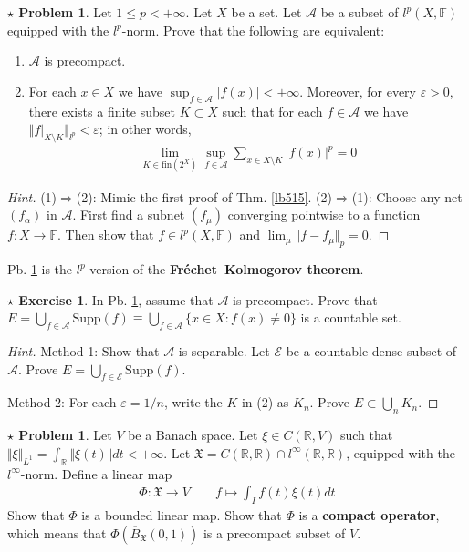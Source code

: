 \documentclass[12pt,b5paper,notitlepage]{article}
\theoremstyle{definition}
\newtheorem{sexe}[df]{$\star$ Exercise}
\newtheorem{sprob}[prob]{\color{red}$\star$ Problem}
\theoremstyle{plain}
\newcommand{\fk}{\mathfrak}
\newcommand{\mc}{\mathcal}
\newcommand{\ovl}{\overline}
\newcommand{\scr}{\mathscr}
\newcommand{\Rbb}{\mathbb R}
\newcommand{\fin}{\mathrm{fin}}
\newcommand{\Supp}{\mathrm{Supp}}
\newcommand{\Fbb}{\mathbb F}
\newcommand{\eps}{\varepsilon}
\numberwithin{equation}{section}
\begin{document}
\begin{sprob}\label{lb570}
Let $1\leq p<+\infty$. Let $X$ be a set. Let $\scr A$ be a subset of $l^p(X,\Fbb)$ equipped with the $l^p$-norm. Prove that the following are equivalent:
\begin{enumerate}[label=(\arabic*)]
\item $\scr A$ is precompact.
\item For each $x\in X$ we have $\sup_{f\in\scr A}|f(x)|<+\infty$. Moreover, for every $\eps>0$, there exists a finite subset $K\subset X$ such that for each $f\in\scr A$ we have $\Vert f|_{X\setminus K}\Vert_{l^p}<\eps$; in other words,
\begin{align}
\lim_{K\in\fin(2^X)}\sup_{f\in\scr A}\sum_{x\in X\setminus K}|f(x)|^p=0
\end{align}
\end{enumerate}
\end{sprob}

\begin{proof}[Hint]
(1)$\Rightarrow$(2): Mimic the first proof of Thm. \ref{lb515}. (2)$\Rightarrow$(1): Choose any net $(f_\alpha)$ in $\scr A$. First find a subnet $(f_\mu)$ converging pointwise to a function $f:X\rightarrow\Fbb$. Then show that $f\in l^p(X,\Fbb)$ and $\lim_\mu \Vert f-f_\mu\Vert_p=0$.
\end{proof}


Pb. \ref{lb570} is the $l^p$-version of the \textbf{Fr\'echet–Kolmogorov theorem}. 

\begin{sexe}
In Pb. \ref{lb570}, assume that $\scr A$ is precompact. Prove that $E=\bigcup_{f\in\scr A}\Supp(f)\equiv\bigcup_{f\in\scr A}\{x\in X:f(x)\neq 0\}$ is a countable set.
\end{sexe}


\begin{proof}[Hint]
Method 1: Show that $\scr A$ is separable. Let $\mc E$ be a countable dense subset of $\scr A$. Prove $E=\bigcup_{f\in\mc E}\Supp(f)$.

Method 2: For each $\eps=1/n$, write the $K$ in (2) as $K_n$. Prove  $E\subset\bigcup_nK_n$.
\end{proof}


\begin{sprob}
Let $V$ be a Banach space. Let $\xi\in C(\Rbb,V)$ such that $\Vert \xi\Vert_{L^1}=\int_\Rbb \Vert \xi(t)\Vert dt<+\infty$. Let $\fk X=C(\Rbb,\Rbb)\cap l^\infty(\Rbb,\Rbb)$, equipped with the $l^\infty$-norm. Define a linear map
\begin{align*}
\Phi:\fk X\rightarrow V\qquad f\mapsto \int_I f(t)\xi(t)dt
\end{align*}
Show that $\Phi$ is a bounded linear map. Show that $\Phi$ is a \textbf{compact operator}, which means that $\Phi(\ovl B_{\fk X}(0,1))$ is a precompact subset of $V$.
\end{sprob}
\end{document}
